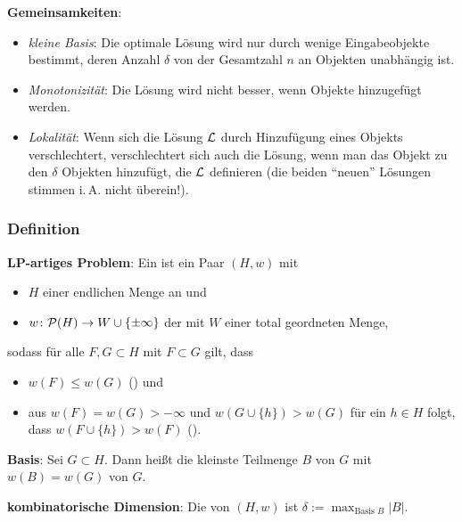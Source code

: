 \textbf{Gemeinsamkeiten}:
\begin{itemize}
    \item
    \emph{kleine Basis}:
    Die optimale Lösung wird nur durch wenige Eingabeobjekte bestimmt,
    deren Anzahl $\delta$ von der Gesamtzahl $n$ an Objekten unabhängig ist.

    \item
    \emph{Monotonizität}:
    Die Lösung wird nicht besser, wenn Objekte hinzugefügt werden.

    \item
    \emph{Lokalität}:
    Wenn sich die Lösung $\L$ durch Hinzufügung eines Objekts verschlechtert,
    verschlechtert sich auch die Lösung, wenn man das Objekt zu den $\delta$ Objekten
    hinzufügt, die $\L$ definieren
    (die beiden "`neuen"' Lösungen stimmen i.\,A. nicht überein!).
\end{itemize}

\pagebreak

\subsubsection{%
    Definition%
}

\textbf{LP-artiges Problem}:
Ein  ist ein Paar $(H, w)$ mit
\begin{itemize}
    \item
    $H$ einer endlichen Menge an  und

    \item
    $w\colon \P(H) \to W \cup \{\pm\infty\}$ der  mit
    $W$ einer total geordneten Menge,
\end{itemize}
sodass für alle $F, G \subset H$ mit $F \subset G$ gilt, dass
\begin{itemize}
    \item
    $w(F) \le w(G)$
    () und

    \item
    aus $w(F) = w(G) > -\infty$ und $w(G \cup \{h\}) > w(G)$ für ein $h \in H$ folgt,\\
    dass $w(F \cup \{h\}) > w(F)$
    ().
\end{itemize}

\linie

\textbf{Basis}:
Sei $G \subset H$.
Dann heißt die kleinste Teilmenge $B$ von $G$ mit $w(B) = w(G)$  von $G$.

\textbf{kombinatorische Dimension}:
Die  von $(H, w)$ ist $\delta := \max_{\text{Basis $B$}} |B|$.

